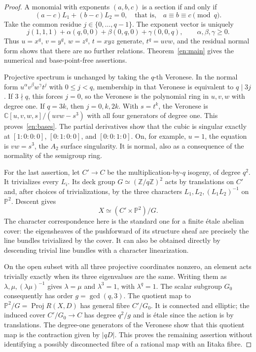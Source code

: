 \documentclass[12pt]{amsart}
\theoremstyle{definition}
\theoremstyle{remark}
\numberwithin{equation}{section}
\newcommand{\Z}{\mathbb{Z}}
\newcommand{\C}{\mathbb{C}}
\newcommand{\mP}{\mathbb{P}}
\DeclareMathOperator{\Proj}{Proj}
\begin{document}
\begin{proof}
A monomial with exponents $(a,b,c)$ is a section if and only if
\[
 (a-c)L_1+(b-c)L_2=0,
 \quad\text{that is,}\quad a\equiv b\equiv c\pmod q.
\]
Take the common residue $j\in\{0,\ldots,q-1\}$. The exponent vector is uniquely
\[
 j(1,1,1)+\alpha(q,0,0)+\beta(0,q,0)+\gamma(0,0,q),
 \qquad\alpha,\beta,\gamma\geq0.
\]
Thus $u=x^q$, $v=y^q$, $w=z^q$, $t=xyz$ generate, $t^q=uvw$, and the residual normal form shows that there are no further relations. Theorem~\ref{en:main} gives the numerical and base-point-free assertions.

Projective spectrum is unchanged by taking the $q$-th Veronese. In the normal form $u^\alpha v^\beta w^\gamma t^j$ with $0\leq j<q$, membership in that Veronese is equivalent to $q\mid3j$. If $3\nmid q$, this forces $j=0$, so the Veronese is the polynomial ring in $u,v,w$ with degree one. If $q=3k$, then $j=0,k,2k$. With $s=t^k$, the Veronese is $\C[u,v,w,s]/(uvw-s^3)$ with all four generators of degree one. This proves~\eqref{en:bases}. The partial derivatives show that the cubic is singular exactly at $[1:0:0:0]$, $[0:1:0:0]$, and $[0:0:1:0]$. On, for example, $u=1$, the equation is $vw=s^3$, the $A_2$ surface singularity. It is normal, also as a consequence of the normality of the semigroup ring.

For the last assertion, let $C'\to C$ be the multiplication-by-$q$ isogeny, of degree $q^2$. It trivializes every $L_i$. Its deck group $G\simeq(\Z/q\Z)^2$ acts by translations on $C'$ and, after choices of trivializations, by the three characters $L_1,L_2,(L_1L_2)^{-1}$ on $\mP^2$. Descent gives
\[
 X\simeq(C'\times\mP^2)/G.
\]
The character correspondence here is the standard one for a finite \'etale abelian cover: the eigensheaves of the pushforward of its structure sheaf are precisely the line bundles trivialized by the cover. It can also be obtained directly by descending trivial line bundles with a character linearization.

On the open subset with all three projective coordinates nonzero, an element acts trivially exactly when its three eigenvalues are the same. Writing them as $\lambda,\mu,(\lambda\mu)^{-1}$ gives $\lambda=\mu$ and $\lambda^3=1$, with $\lambda^q=1$. The scalar subgroup $G_0$ consequently has order $g=\gcd(q,3)$. The quotient map to $\mP^2/G=\Proj R(X,D)$ has general fibre $C'/G_0$. It is connected and elliptic; the induced cover $C'/G_0\to C$ has degree $q^2/g$ and is \'etale since the action is by translations. The degree-one generators of the Veronese show that this quotient map is the contraction given by $|qD|$. This proves the remaining assertion without identifying a possibly disconnected fibre of a rational map with an Iitaka fibre.
\end{proof}
\end{document}
